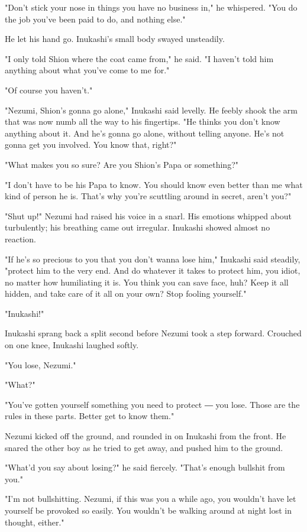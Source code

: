 "Don't stick your nose in things you have no business in," he whispered.
"You do the job you've been paid to do, and nothing else."

He let his hand go. Inukashi's small body swayed unsteadily.

"I only told Shion where the coat came from," he said. "I haven't told
him anything about what you've come to me for."

"Of course you haven't."

"Nezumi, Shion's gonna go alone," Inukashi said levelly. He feebly shook
the arm that was now numb all the way to his fingertips. "He thinks you
don't know anything about it. And he's gonna go alone, without telling
anyone. He's not gonna get you involved. You know that, right?"

"What makes you so sure? Are you Shion's Papa or something?"

"I don't have to be his Papa to know. You should know even better than
me what kind of person he is. That's why you're scuttling around in
secret, aren't you?"

"Shut up!" Nezumi had raised his voice in a snarl. His emotions whipped
about turbulently; his breathing came out irregular. Inukashi showed
almost no reaction.

"If he's so precious to you that you don't wanna lose him," Inukashi
said steadily, "protect him to the very end. And do whatever it takes to
protect him, you idiot, no matter how humiliating it is. You think you
can save face, huh? Keep it all hidden, and take care of it all on your
own? Stop fooling yourself."

"Inukashi!"

Inukashi sprang back a split second before Nezumi took a step forward.
Crouched on one knee, Inukashi laughed softly.

"You lose, Nezumi."

"What?"

"You've gotten yourself something you need to protect ― you lose. Those
are the rules in these parts. Better get to know them."

Nezumi kicked off the ground, and rounded in on Inukashi from the front.
He snared the other boy as he tried to get away, and pushed him to the
ground.

"What'd you say about losing?" he said fiercely. "That's enough bullshit
from you."

"I'm not bullshitting. Nezumi, if this was you a while ago, you wouldn't
have let yourself be provoked so easily. You wouldn't be walking around
at night lost in thought, either."

